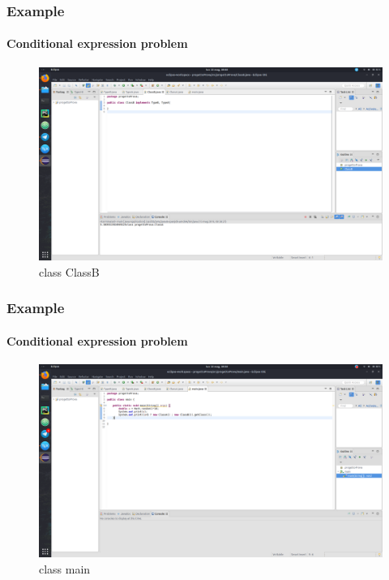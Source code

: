 \documentclass{beamer}
\begin{document}
\begin{frame}
\frametitle{Example}
\framesubtitle{Conditional expression problem}
\begin{figure}
\centering
\includegraphics[width=1\linewidth]{images/classb}
\caption{ class ClassB}
\label{fig:classb}
\end{figure}
\end{frame}

\begin{frame}
\frametitle{Example}
\framesubtitle{Conditional expression problem}
\begin{figure}
\centering
\includegraphics[width=1\linewidth]{images/main}
\caption{ class main}
\label{fig:main}
\end{figure}
\end{frame}
\end{document}
